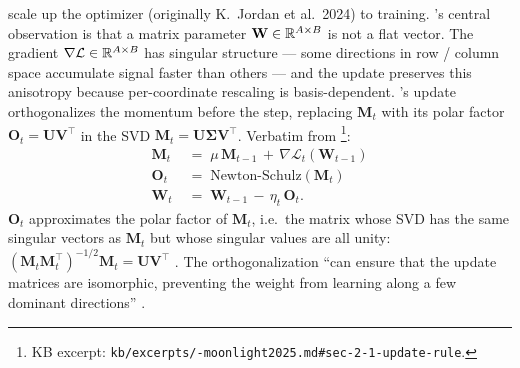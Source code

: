 \citet{muon-moonlight2025} scale up the  optimizer
(originally K.\ Jordan et al.\ 2024) to  training. 's central
observation is that a matrix parameter $\mathbf{W} \in \mathbb{R}^{A \times B}$
is not a flat vector. The gradient $\nabla \mathcal{L} \in \mathbb{R}^{A
\times B}$ has singular structure --- some directions in row /
column space accumulate signal faster than others --- and the 
update preserves this anisotropy because per-coordinate rescaling is
basis-dependent. 's update orthogonalizes the momentum before
the step, replacing $\mathbf{M}_t$ with its polar factor $\mathbf{O}_t
= \mathbf{U} \mathbf{V}^\top$ in the SVD $\mathbf{M}_t = \mathbf{U}
\boldsymbol{\Sigma} \mathbf{V}^\top$. Verbatim from
\citet[\S 2.1, eq.\ 1]{muon-moonlight2025}\footnote{KB excerpt:
\texttt{kb/excerpts/-moonlight2025.md\#sec-2-1-update-rule}.}:
\begin{equation}
\begin{aligned}
\mathbf{M}_t &\;=\; \mu \, \mathbf{M}_{t-1} \,+\, \nabla \mathcal{L}_t(\mathbf{W}_{t-1}) \\
\mathbf{O}_t &\;=\; \mathrm{Newton\text{-}Schulz}(\mathbf{M}_t) \\
\mathbf{W}_t &\;=\; \mathbf{W}_{t-1} \,-\, \eta_t \,\mathbf{O}_t.
\end{aligned}
\label{eq:muon-vanilla}
\tag{3}
\end{equation}
$\mathbf{O}_t$ approximates the polar factor of $\mathbf{M}_t$, i.e.\
the matrix whose SVD has the same singular vectors as $\mathbf{M}_t$
but whose singular values are all unity:
$(\mathbf{M}_t \mathbf{M}_t^\top)^{-1/2} \mathbf{M}_t = \mathbf{U}
\mathbf{V}^\top$ \citep[\S 2.1]{muon-moonlight2025}. The
orthogonalization ``can ensure that the update matrices are
isomorphic, preventing the weight from learning along a few dominant
directions'' \citep[\S 2.1]{muon-moonlight2025}.

